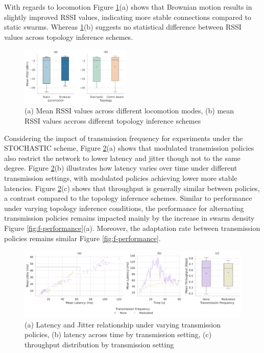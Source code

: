 \documentclass[conference]{IEEEtran}
\begin{document}
With regards to locomotion Figure \ref{fig:rssi}(a) shows that Brownian motion results in slightly improved RSSI values, indicating more stable connections compared to static swarms. Whereas \ref{fig:rssi}(b) suggests no statistical difference between RSSI values across topology inference schemes.

\begin{figure}[H]
    \centering
    \includegraphics[width=0.47\textwidth]{speed_impact.pdf}
    \caption{(a) Mean RSSI values across different locomotion modes, (b) mean RSSI values accross different topology inference schemes}
    \label{fig:rssi}
\end{figure}

Considering the impact of transmission frequency for experiments under the STOCHASTIC scheme, Figure \ref{fig:frequency}(a) shows that modulated transmission policies also restrict the network to lower latency and jitter though not to the same degree. Figure \ref{fig:frequency}(b) illustrates how latency varies over time under different transmission settings, with modulated policies achieving lower more stable latencies. Figure \ref{fig:frequency}(c) shows that throughput is generally similar between policies, a contrast compared to the topology inference schemes. Similar to performance under varying topology inference conditions, the performance for alternating transmission policies remains impacted mainly by the increase in swarm density Figure \ref{fig:f-performance}(a). Moreover, the adaptation rate between transmission policies remains similar Figure \ref{fig:f-performance}.\\

\begin{figure}[h]
    \centering
    \includegraphics[width=1\textwidth]{frequency_impact.pdf}
    \caption{(a) Latency and Jitter relationship under varying transmission policies, (b) latency across time by transmission setting, (c) throughput distribution by transmission setting}
    \label{fig:frequency}
\end{figure}
\end{document}
